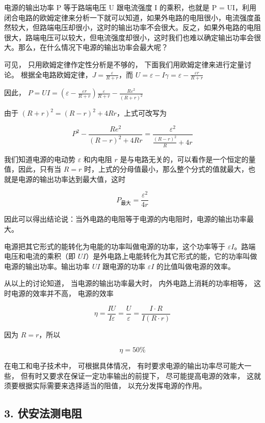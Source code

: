 电源的输出功率 P 等于路端电压 U 跟电流强度 I 的乘积，也就是 P =
UI，利用闭合电路的欧姆定律来分析一下就可以知道，如果外电路的电阻很小，电流强度虽然较大，但路端电压却很小，这时的输出功率不会很大。反之，如果外电路的电阻很大，路端电压可以较大，但电流强度却很小，这时我们也难以确定输出功率会很大。那么，在什么情况下电源的输出功率会最大呢？

可见， 只用欧姆定律作定性分析是不够的，
下面我们用欧姆定律来进行定量讨论。
根据全电路欧姆定律，\(J = \frac{\varepsilon}{R + r}\)，而
\(U = \varepsilon - I\gamma = \varepsilon - \frac{\varepsilon r}{R + r}\)

因此，
\(P = U I = \left(\varepsilon -\frac{\varepsilon r}{R + r}\right)\frac{\varepsilon}{R + r} -\frac{R\varepsilon^2}{(R + r)^2}\)

由于 \((R + r)^2 = (R - r)^2 + 4Rr\)，上式可改写为

\[
P^{2} - \frac{R e^{2}}{(R - r)^{2} + 4 R r} = \frac{\varepsilon^{2}}{\frac{(R - r)^{2}}{R} + 4 r}
\]

我们知道电源的电动势 \(\varepsilon\) 和内电阻 \(r\)
是与电路无关的，可以看作是一个恒定的量值，因此，只有当 \(R = r\)
时，上式的分母值最小，那么整个分式的值就最大，也就是电源的输出功率达到最大值，这时

\[
P_{\text{最大}} = \frac{\varepsilon^{2}}{4 r}
\]

因此可以得出结论说：当外电路的电阻等于电源的内电阻时，电源的输出功率最大。

电源把其它形式的能转化为电能的功率叫做电源的功率，这个功率等于
\(\varepsilon I\)。路端电压和电流的乘积（即
\(UI\)）是外电路上电能转化为其它形式的能，它的功率叫做电源的输出功率。输出功率
\(UI\) 跟电源的功率 \(\varepsilon I\) 的比值叫做电源的效率。

从以上的讨论知道， 当电源的输出功率最大时， 内外电路上消耗的功率相等，
这时电源的效率并不高， 电源的效率

\[
\eta = \frac{I U}{I \varepsilon} = \frac{U}{\varepsilon} = \frac{I \cdot R}{I (R \cdot r)}
\]

因为 \(R = r\)，所以

\[
\eta = 50 \%
\]

在电工和电子技术中， 可根据具体情况，
有时要求电源的输出功率尽可能大一些，
但有时又要求在保证一定功率输出的前提下， 尽可能提高电源的效率，
这就须要根据实际需要来选择适当的阻值， 以充分发挥电源的作用。

\subsection{3. 伏安法测电阻}\label{ux4f0fux5b89ux6cd5ux6d4bux7535ux963b}

